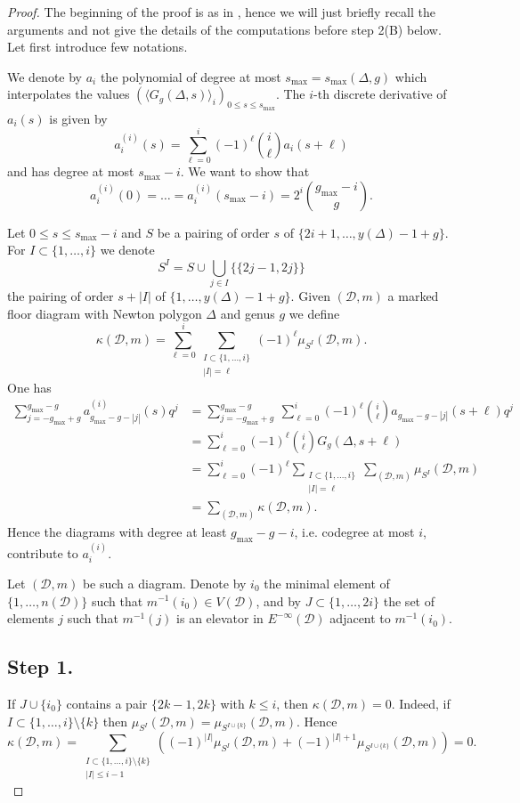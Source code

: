 \documentclass[11pt]{article}
\theoremstyle{definition}
\numberwithin{equation}{section}
\newcommand{\nocontentsline}[3]{}
\newcommand{\tocless}[2]{\bgroup\let\addcontentsline=\nocontentsline#1{#2}\egroup}
\newcommand{\D}{\mathcal{D}}
\newcommand{\dsum}{\displaystyle\sum}
\newcommand{\gmax}{g_{\max}}
\newcommand{\smax}{s_{\max}}
\theoremstyle{plain}
\begin{document}
\begin{proof}
The beginning of the proof is as in \cite[Theorem 1.7]{brugalle_polynomiality_2022}, hence we will just briefly recall the arguments and not give the details of the computations before step 2(B) below. Let first introduce few notations.

We denote by $a_i$ the polynomial of degree at most $\smax = \smax(\Delta,g)$ which interpolates the values $(\langle G_g(\Delta,s) \rangle_i)_{0 \leqslant s \leqslant \smax}$. The $i$-th discrete derivative of $a_i(s)$ is
given by
\[ a_i^{(i)}(s) = \dsum_{\ell=0}^i (-1)^\ell \binom{i}{\ell} a_i(s+\ell) \]
and has degree at most $\smax-i$. We want to show that 
\[ a_i^{(i)}(0) = \dots = a_i^{(i)}(s_{\max}-i) = 2^i \binom{\gmax-i}{g} .\]

	Let $0 \leqslant s \leqslant \smax-i$ and $S$ be a pairing of order $s$ of $\{ 2i+1,\dots,y(\Delta)-1+g \}$. For $I \subset \{1,\dots, i\}$ we denote 
\[ S^I = S \cup \bigcup_{j\in I} \{ \{ 2j-1,2j \}  \} \]
the pairing of order $s+|I|$ of $\{1,\dots,y(\Delta)-1+g\}$.
	Given $(\D,m)$ a marked floor diagram with Newton polygon $\Delta$ and genus $g$ we define
	\[ \kappa(\D,m) = \dsum_{\ell =0}^i \dsum_{\substack{I \subset \{1,\dots,i\} \\ |I| = \ell}} (-1)^\ell \mu_{S^I}(\D,m) .  \]
	One has
\begin{align*}
 \dsum_{j=-\gmax+g}^{\gmax-g} a^{(i)}_{\gmax-g-|j|}(s)q^j 
  &= \dsum_{j=-\gmax+g}^{\gmax-g} \   \dsum_{\ell=0}^i (-1)^\ell \binom{i}{\ell} a_{\gmax-g-|j|}(s+\ell) q^j   \\
  &= \dsum_{\ell=0}^i (-1)^\ell \binom{i}{\ell} G_g(\Delta,s+\ell)  \\
  &= \dsum_{\ell =0}^i  (-1)^\ell \dsum_{\substack{I \subset \{1,\dots,i\} \\ |I| = \ell}} \dsum_{(\D,m)} \mu_{S^I}(\D,m)  \\
  &= \dsum_{(\D,m)} \kappa(\D,m)  .
\end{align*}
 Hence the diagrams with degree at least $\gmax-g-i$, i.e.  codegree at most $i$, contribute to $a_i^{(i)}$.
	
	Let $(\D,m)$ be such a diagram. Denote by $i_0$ the minimal element of $\{1,\dots,n(\D)\}$ such that $m^{-1}(i_0) \in V(\D)$, and by $J \subset \{1,\dots,2i\}$ the set of elements $j$ such that $m^{-1}(j)$ is an elevator in $E^{-\infty}(\D)$ adjacent to $m^{-1}(i_0)$.


\tocless{\subsection*{Step 1.}} 
If $J\cup \{i_0\}$ contains a pair $\{2k-1,2k\}$ with $k\leqslant i$, then $\kappa(\D,m) = 0$.
Indeed, if $I \subset \{1,\dots,i\} \setminus \{k\}$ then $\mu_{S^I}(\D,m) = \mu_{S^{I\cup\{k\}}}(\D,m)$. Hence
\[ \kappa(\D,m) = \dsum_{\substack{I\subset\{1,\dots,i\}\setminus\{k\} \\ |I| \leqslant i-1}} \left((-1)^{|I|} \mu_{S^I}(\D,m)  + (-1)^{|I|+1} \mu_{S^{I\cup\{k\}}}(\D,m)  \right) = 0.   \]


\end{proof}
\end{document}
